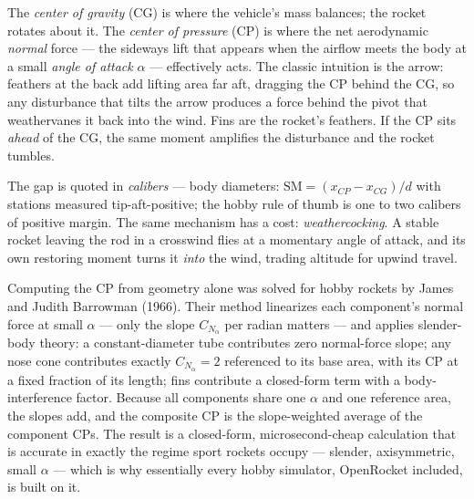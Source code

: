 \begin{physbox}
The \emph{center of gravity} (CG) is where the vehicle's mass balances; the rocket rotates
about it. The \emph{center of pressure} (CP) is where the net aerodynamic \emph{normal}
force --- the sideways lift that appears when the airflow meets the body at a small
\emph{angle of attack} $\alpha$ --- effectively acts. The classic intuition is the arrow:
feathers at the back add lifting area far aft, dragging the CP behind the CG, so any
disturbance that tilts the arrow produces a force behind the pivot that weathervanes it back
into the wind. Fins are the rocket's feathers. If the CP sits \emph{ahead} of the CG, the
same moment amplifies the disturbance and the rocket tumbles.

The gap is quoted in \emph{calibers} --- body diameters:
$\mathrm{SM} = (x_{CP} - x_{CG})/d$ with stations measured tip-aft-positive; the hobby rule
of thumb is one to two calibers of positive margin. The same mechanism has a cost:
\emph{weathercocking}. A stable rocket leaving the rod in a crosswind flies at a momentary
angle of attack, and its own restoring moment turns it \emph{into} the wind, trading
altitude for upwind travel.

Computing the CP from geometry alone was solved for hobby rockets by James and Judith
Barrowman (1966). Their method linearizes each component's normal force at small $\alpha$
--- only the slope $C_{N_\alpha}$ per radian matters --- and applies slender-body theory: a
constant-diameter tube contributes zero normal-force slope; any nose cone contributes
exactly $C_{N_\alpha} = 2$ referenced to its base area, with its CP at a fixed fraction of
its length; fins contribute a closed-form term with a body-interference factor. Because all
components share one $\alpha$ and one reference area, the slopes add, and the composite CP
is the slope-weighted average of the component CPs. The result is a closed-form,
microsecond-cheap calculation that is accurate in exactly the regime sport rockets occupy
--- slender, axisymmetric, small $\alpha$ --- which is why essentially every hobby
simulator, OpenRocket included, is built on it.
\end{physbox}

